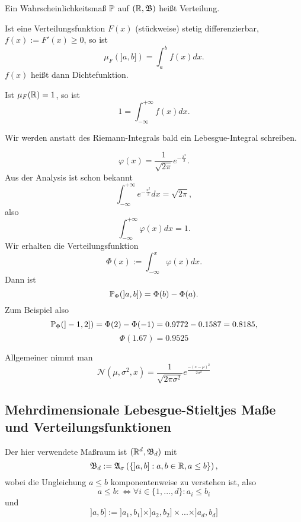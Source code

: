 			\begin{defi}
				Ein Wahrscheinlichkeitsmaß $\P$ auf $(\R,\mf{B})$ heißt Verteilung. 
			\end{defi}
			
			\begin{satz}
				Ist eine Verteilungsfunktion $F(x)$ (stückweise) stetig differenzierbar, $f(x):=F'(x)\ge0$, so ist
				\[ \mu_F(]a,b])=\int_{a}^{b} f(x)dx. \]
				$f(x)$ heißt dann Dichtefunktion. 
			\end{satz}
			
			\begin{bem}
				Ist $\mu_F(\R)=1$, so ist
				\[ 1=\int_{-\infty}^{+\infty} f(x)dx. \]
			\end{bem}
			
			\begin{bem}
				Wir werden anstatt des Riemann-Integrals bald ein Lebesgue-Integral schreiben.
			\end{bem}
			
			\begin{bsp} [Standardnormalverteilung]
				\[ \varphi(x)=\frac{1}{\sqrt{2\pi}}e^{-\frac{x^2}{2}}. \]
				Aus der Analysis ist schon bekannt
				\[ \int_{-\infty}^{+\infty}e^{-\frac{x^2}{2}}dx=\sqrt{2\pi}, \]
				also
				\[ \int_{-\infty}^{+\infty}\varphi(x)dx=1. \]
				Wir erhalten die Verteilungsfunktion
				\[ \Phi(x):=\int_{-\infty}^{x}\varphi(x)dx. \]
				Dann ist
				\[ \P_\Phi(]a,b])=\Phi(b)-\Phi(a). \]
				Zum Beispiel also 
				\[ \P_\Phi(]-1,2])=\Phi(2)-\Phi(-1)=0.9772-0.1587=0.8185, \]
				\[ \Phi(1.67)=0.9525 \]
			\end{bsp}
			
			\begin{bsp}
				Allgemeiner nimmt man 
				\[ \mathcal{N}(\mu,\sigma^2,x)=\frac{1}{\sqrt{2\pi \sigma^2}}e^\frac{-(x-\mu)^2}{2\sigma^2} \]
			\end{bsp}
			
		\subsection{Mehrdimensionale Lebesgue-Stieltjes Maße und Verteilungsfunktionen}
			Der hier verwendete Maßraum ist $(\R^d, \mf{B}_d)$ mit 
			\[ \mf{B}_d:=\mf{A}_\sigma\left(\{]a,b]: a,b\in\R, a\le b\}\right), \]
			wobei die Ungleichung $a\le b$ komponentenweise zu verstehen ist, also
			\[ a\le b:\Leftrightarrow\forall i\in\{1,...,d\}: a_i\le b_i \]
			und 
			\[ ]a,b]:=]a_1,b_1]\times]a_2,b_2]\times...\times]a_d,b_d] \]
			
